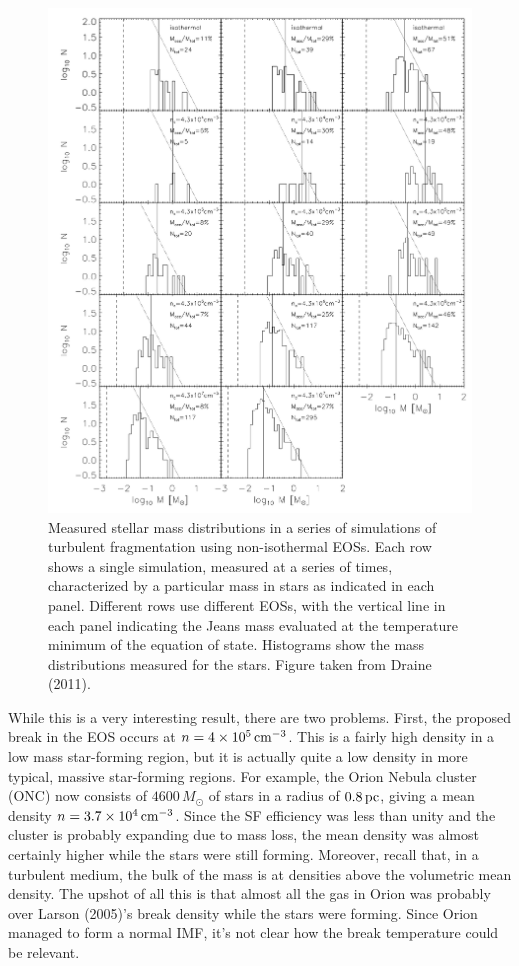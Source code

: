 \documentclass[a4paper,10pt]{article}
\begin{document}
\begin{figure}[t!]
    \centering
    \includegraphics[width=16cm]{figures/IMFmodels.png}
    \caption{\footnotesize{Measured stellar mass distributions in a series of simulations of turbulent fragmentation using non-isothermal EOSs. Each row shows a single simulation, measured at a series of times, characterized by a particular mass in stars as indicated in each panel. Different rows use different EOSs, with the vertical line in each panel indicating the Jeans mass evaluated at the temperature minimum of the equation of state. Histograms show the mass distributions measured for the stars. Figure taken from Draine (2011).}}
    \label{fig:imfmodels}
\end{figure}

{\noindent}While this is a very interesting result, there are two problems. First, the proposed break in the EOS occurs at $n=4\times10^5\,{\rm cm^{-3}}$. This is a fairly high density in a low mass star-forming region, but it is actually quite a low density in more typical, massive star-forming regions. For example, the Orion Nebula cluster (ONC) now consists of $4600\,{M_\odot}$ of stars in a radius of $0.8\,{\rm pc}$, giving a mean density $n=3.7\times10^4\,{\rm cm^{-3}}$. Since the SF efficiency was less than unity and the cluster is probably expanding due to mass loss, the mean density was almost certainly higher while the stars were still forming. Moreover, recall that, in a turbulent medium, the bulk of the mass is at densities above the volumetric mean density. The upshot of all this is that almost all the gas in Orion was probably over Larson (2005)'s break density while the stars were forming. Since Orion managed to form a normal IMF, it's not clear how the break temperature could be relevant.
\end{document}
